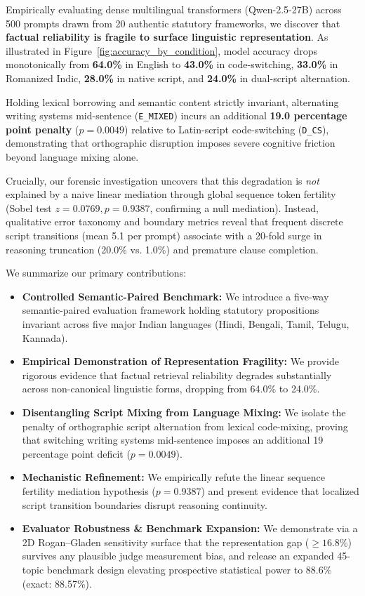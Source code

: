 \documentclass[11pt]{article}
\begin{document}
Empirically evaluating dense multilingual transformers (Qwen-2.5-27B) across 500 prompts drawn from 20 authentic statutory frameworks, we discover that \textbf{factual reliability is fragile to surface linguistic representation}. As illustrated in Figure~\ref{fig:accuracy_by_condition}, model accuracy drops monotonically from \textbf{64.0\%} in English to \textbf{43.0\%} in code-switching, \textbf{33.0\%} in Romanized Indic, \textbf{28.0\%} in native script, and \textbf{24.0\%} in dual-script alternation.

Holding lexical borrowing and semantic content strictly invariant, alternating writing systems mid-sentence (\texttt{E\_MIXED}) incurs an additional \textbf{19.0 percentage point penalty} ($p = 0.0049$) relative to Latin-script code-switching (\texttt{D\_CS}), demonstrating that orthographic disruption imposes severe cognitive friction beyond language mixing alone.

Crucially, our forensic investigation uncovers that this degradation is \textit{not} explained by a naive linear mediation through global sequence token fertility (Sobel test $z = 0.0769, p = 0.9387$, confirming a null mediation). Instead, qualitative error taxonomy and boundary metrics reveal that frequent discrete script transitions (mean 5.1 per prompt) associate with a 20-fold surge in reasoning truncation (20.0\% vs. 1.0\%) and premature clause completion.

We summarize our primary contributions:
\begin{itemize}
    \item \textbf{Controlled Semantic-Paired Benchmark:} We introduce a five-way semantic-paired evaluation framework holding statutory propositions invariant across five major Indian languages (Hindi, Bengali, Tamil, Telugu, Kannada).
    \item \textbf{Empirical Demonstration of Representation Fragility:} We provide rigorous evidence that factual retrieval reliability degrades substantially across non-canonical linguistic forms, dropping from 64.0\% to 24.0\%.
    \item \textbf{Disentangling Script Mixing from Language Mixing:} We isolate the penalty of orthographic script alternation from lexical code-mixing, proving that switching writing systems mid-sentence imposes an additional 19 percentage point deficit ($p = 0.0049$).
    \item \textbf{Mechanistic Refinement:} We empirically refute the linear sequence fertility mediation hypothesis ($p = 0.9387$) and present evidence that localized script transition boundaries disrupt reasoning continuity.
    \item \textbf{Evaluator Robustness \& Benchmark Expansion:} We demonstrate via a 2D Rogan--Gladen sensitivity surface that the representation gap ($\ge 16.8\%$) survives any plausible judge measurement bias, and release an expanded 45-topic benchmark design elevating prospective statistical power to 88.6\% (exact: 88.57\%).
\end{itemize}
\end{document}
